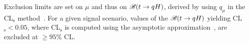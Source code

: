Exclusion limits are set on $\mu$ and thus on
$\mathscr{B}(t\to qH)$, derived by using $q_\mu$ in the CL$_{\textrm{s}}$ method~\cite{Junk:1999kv,Read:2002hq}.
For a given signal scenario, values of the $\mathscr{B}(t\to qH)$ yielding CL$_{\textrm{s}} < 0.05$,
where CL$_{\textrm{s}}$ is computed using the asymptotic approximation~\cite{Cowan:2010js}, are excluded at $\geq 95\%$ CL.
